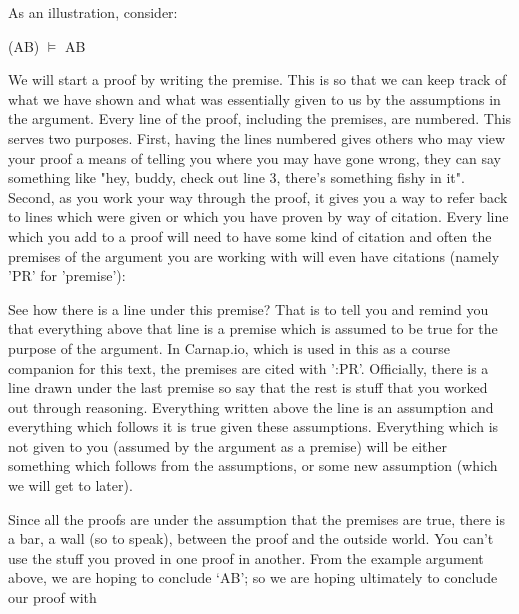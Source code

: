 As an illustration, consider:
\begin{center}
\enot (A\eor B) $\vDash$ \enot A\eand  \enot B
\end{center}
We will start a proof by writing the premise. This is so that we can keep track of what we have shown and what was essentially given to us by the assumptions in the argument. Every line of the proof, including the premises, are numbered. This serves two purposes. First, having the lines numbered gives others who may view your proof a means of telling you where you may have gone wrong, they can say something like "hey, buddy, check out line 3, there's something fishy in it". Second, as you work your way through the proof, it gives you a way to refer back to lines which were given or which you have proven by way of citation. Every line which you add to a proof will need to have some kind of citation and often the premises of the argument you are working with will even have citations (namely 'PR' for 'premise'):

\begin{fitchproof}
\end{fitchproof}

See how there is a line under this premise? That is to tell you and remind you that everything above that line is a premise which is assumed to be true for the purpose of the argument. In Carnap.io, which is used in this as a course companion for this text, the premises are cited with ':PR'. Officially, there is a line drawn under the last premise so say that the rest is stuff that you worked out through reasoning. Everything written above the line is an assumption and everything which follows it is true given these assumptions. Everything which is not given to you (assumed by the argument as a premise) will be either something which follows from the assumptions, or some new assumption (which we will get to later).

Since all the proofs are under the assumption that the premises are true, there is a bar, a wall (so to speak), between the proof and the outside world. You can't use the stuff you proved in one proof in another. From the example argument above, we are hoping to conclude ‘\enot A\eand \enot B’; so we are hoping ultimately to conclude our proof with

\begin{fitchproof}
\end{fitchproof}

